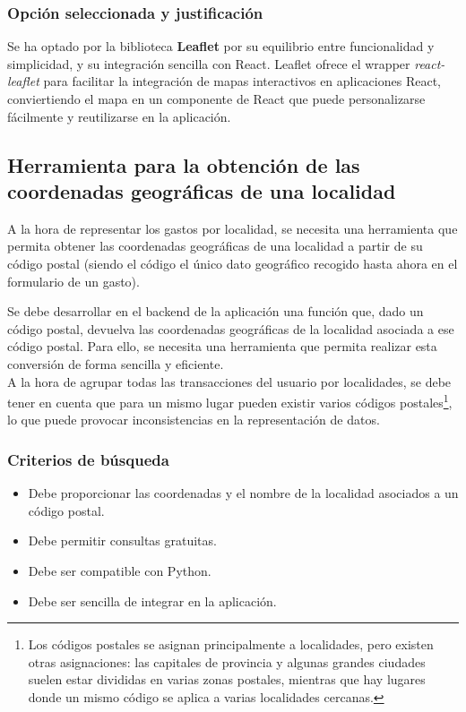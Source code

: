\subsubsection{Opción seleccionada y justificación}
Se ha optado por la biblioteca \textbf{Leaflet} por su equilibrio entre funcionalidad y simplicidad, y su integración sencilla con React. Leaflet ofrece el wrapper \textit{react-leaflet} para facilitar la integración de mapas interactivos en aplicaciones React, conviertiendo el mapa en un componente de React que puede personalizarse fácilmente y reutilizarse en la aplicación\cite{khan2023reactjs}.


\subsection{Herramienta para la obtención de las coordenadas geográficas de una localidad}
A la hora de representar los gastos por localidad, se necesita una herramienta que permita obtener las coordenadas geográficas de una localidad a partir de su código postal (siendo el código el único dato geográfico recogido hasta ahora en el formulario de un gasto). 

Se debe desarrollar en el backend de la aplicación una función que, dado un código postal, devuelva las coordenadas geográficas de la localidad asociada a ese código postal. Para ello, se necesita una herramienta que permita realizar esta conversión de forma sencilla y eficiente.\\

A la hora de agrupar todas las transacciones del usuario por localidades, se debe tener en cuenta que para un mismo lugar pueden existir varios códigos postales\footnote{Los códigos postales se asignan principalmente a localidades, pero existen otras asignaciones: las capitales de provincia y algunas grandes ciudades suelen estar divididas en varias zonas postales, mientras que hay lugares donde un mismo código se aplica a varias localidades cercanas\cite{cp-wikipedia}.}, lo que puede provocar inconsistencias en la representación de datos.

\subsubsection{Criterios de búsqueda}
\begin{itemize}
    \item Debe proporcionar las coordenadas y el nombre de la localidad asociados a un código postal.
    \item Debe permitir consultas gratuitas.
    \item Debe ser compatible con Python.
    \item Debe ser sencilla de integrar en la aplicación.
\end{itemize}
